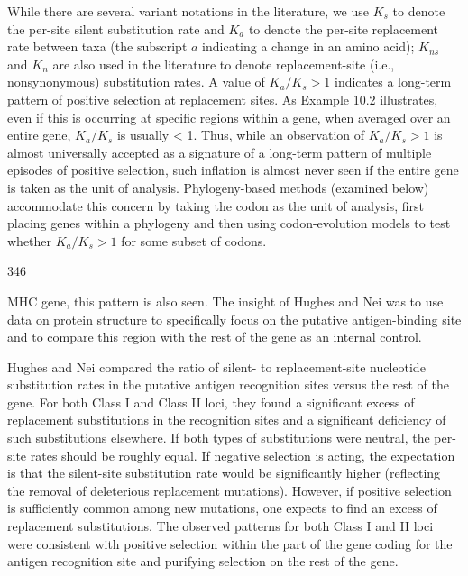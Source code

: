 \documentclass{article}
\begin{document}
While there are several variant notations in the literature, we use  $ K_s $ to denote the per-site silent substitution rate and  $ K_a $ to denote the per-site replacement rate between taxa (the subscript  $ a $ indicating a change in an amino acid);  $ K_{ns} $ and  $ K_n $ are also used in the literature to denote replacement-site (i.e., nonsynonymous) substitution rates. A value of  $ K_a/K_s > 1 $ indicates a long-term pattern of positive selection at replacement sites. As Example 10.2 illustrates, even if this is occurring at specific regions within a gene, when averaged over an entire gene,  $ K_a/K_s $ is usually < 1. Thus, while an observation of  $ K_a/K_s > 1 $ is almost universally accepted as a signature of a long-term pattern of multiple episodes of positive selection, such inflation is almost never seen if the entire gene is taken as the unit of analysis. Phylogeny-based methods (examined below) accommodate this concern by taking the codon as the unit of analysis, first placing genes within a phylogeny and then using codon-evolution models to test whether  $ K_a/K_s > 1 $ for some subset of codons.

346

MHC gene, this pattern is also seen. The insight of Hughes and Nei was to use data on protein structure to specifically focus on the putative antigen-binding site and to compare this region with the rest of the gene as an internal control.

Hughes and Nei compared the ratio of silent- to replacement-site nucleotide substitution rates in the putative antigen recognition sites versus the rest of the gene. For both Class I and Class II loci, they found a significant excess of replacement substitutions in the recognition sites and a significant deficiency of such substitutions elsewhere. If both types of substitutions were neutral, the per-site rates should be roughly equal. If negative selection is acting, the expectation is that the silent-site substitution rate would be significantly higher (reflecting the removal of deleterious replacement mutations). However, if positive selection is sufficiently common among new mutations, one expects to find an excess of replacement substitutions. The observed patterns for both Class I and II loci were consistent with positive selection within the part of the gene coding for the antigen recognition site and purifying selection on the rest of the gene.
\end{document}
